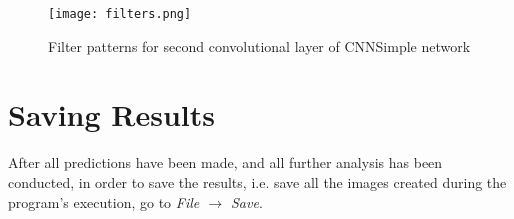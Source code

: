 \begin{figure}[h]
	\centering
	\texttt{[image: filters.png]}
	\caption{Filter patterns for second convolutional layer of CNNSimple network}
	\label{fig:filters}
\end{figure}

\clearpage

\section{Saving Results}
After all predictions have been made, and all further analysis has been conducted, in order to save the results, i.e. save all the images created during the program's execution, go to \emph{File $\rightarrow$ Save}.
